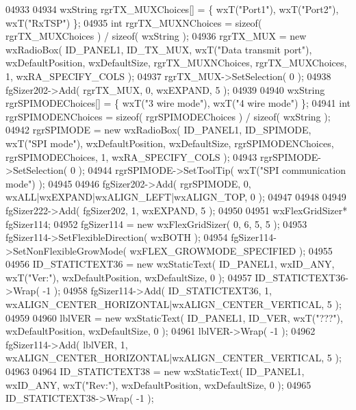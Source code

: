 \begin{DoxyCode}
04933     
04934     wxString rgrTX\_MUXChoices[] = \{ wxT(\textcolor{stringliteral}{"Port1"}), wxT(\textcolor{stringliteral}{"Port2"}), wxT(\textcolor{stringliteral}{"RxTSP"}) \};
04935     \textcolor{keywordtype}{int} rgrTX\_MUXNChoices = \textcolor{keyword}{sizeof}( rgrTX\_MUXChoices ) / \textcolor{keyword}{sizeof}( wxString );
04936     rgrTX_MUX = \textcolor{keyword}{new} wxRadioBox( ID_PANEL1, ID_TX_MUX, wxT(\textcolor{stringliteral}{"Data transmit port"}), wxDefaultPosition, 
      wxDefaultSize, rgrTX\_MUXNChoices, rgrTX\_MUXChoices, 1, wxRA\_SPECIFY\_COLS );
04937     rgrTX_MUX->SetSelection( 0 );
04938     fgSizer202->Add( rgrTX_MUX, 0, wxEXPAND, 5 );
04939     
04940     wxString rgrSPIMODEChoices[] = \{ wxT(\textcolor{stringliteral}{"3 wire mode"}), wxT(\textcolor{stringliteral}{"4 wire mode"}) \};
04941     \textcolor{keywordtype}{int} rgrSPIMODENChoices = \textcolor{keyword}{sizeof}( rgrSPIMODEChoices ) / \textcolor{keyword}{sizeof}( wxString );
04942     rgrSPIMODE = \textcolor{keyword}{new} wxRadioBox( ID_PANEL1, ID_SPIMODE, wxT(\textcolor{stringliteral}{"SPI mode"}), wxDefaultPosition, wxDefaultSize, 
      rgrSPIMODENChoices, rgrSPIMODEChoices, 1, wxRA\_SPECIFY\_COLS );
04943     rgrSPIMODE->SetSelection( 0 );
04944     rgrSPIMODE->SetToolTip( wxT(\textcolor{stringliteral}{"SPI communication mode"}) );
04945     
04946     fgSizer202->Add( rgrSPIMODE, 0, wxALL|wxEXPAND|wxALIGN\_LEFT|wxALIGN\_TOP, 0 );
04947     
04948     
04949     fgSizer222->Add( fgSizer202, 1, wxEXPAND, 5 );
04950     
04951     wxFlexGridSizer* fgSizer114;
04952     fgSizer114 = \textcolor{keyword}{new} wxFlexGridSizer( 0, 6, 5, 5 );
04953     fgSizer114->SetFlexibleDirection( wxBOTH );
04954     fgSizer114->SetNonFlexibleGrowMode( wxFLEX\_GROWMODE\_SPECIFIED );
04955     
04956     ID_STATICTEXT36 = \textcolor{keyword}{new} wxStaticText( ID_PANEL1, wxID\_ANY, wxT(\textcolor{stringliteral}{"Ver:"}), wxDefaultPosition, wxDefaultSize,
       0 );
04957     ID_STATICTEXT36->Wrap( -1 );
04958     fgSizer114->Add( ID_STATICTEXT36, 1, wxALIGN\_CENTER\_HORIZONTAL|wxALIGN\_CENTER\_VERTICAL, 5 );
04959     
04960     lblVER = \textcolor{keyword}{new} wxStaticText( ID_PANEL1, ID_VER, wxT(\textcolor{stringliteral}{"???"}), wxDefaultPosition, wxDefaultSize, 0 );
04961     lblVER->Wrap( -1 );
04962     fgSizer114->Add( lblVER, 1, wxALIGN\_CENTER\_HORIZONTAL|wxALIGN\_CENTER\_VERTICAL, 5 );
04963     
04964     ID_STATICTEXT38 = \textcolor{keyword}{new} wxStaticText( ID_PANEL1, wxID\_ANY, wxT(\textcolor{stringliteral}{"Rev:"}), wxDefaultPosition, wxDefaultSize,
       0 );
04965     ID_STATICTEXT38->Wrap( -1 );

\end{DoxyCode}
